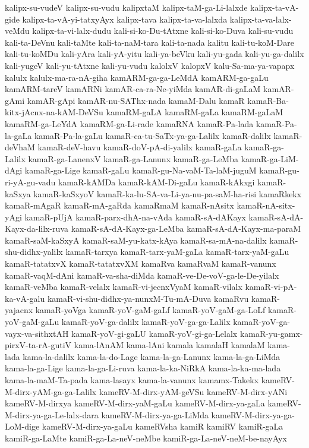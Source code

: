 {kalipx-su-vudeV
kalipx-su-vudu
kalipxtaM
kalipx-taM-ga-Li-lalxde
kalipx-ta-vA-gide
kalipx-ta-vA-yi-tatxyAyx
kalipx-tava
kalipx-ta-va-lalxda
kalipx-ta-va-lalx-veMdu
kalipx-ta-vi-lalx-dudu
kali-si-ko-Du-tAtxne
kali-si-ko-Duva
kali-su-vudu
kali-ta-DeVnu
kali-taMte
kali-ta-naM-tara
kali-ta-nada
kalitu
kali-tu-koM-Dare
kali-tu-koMDu
kali-yAra
kali-yA-yitu
kali-ya-beVku
kali-yu-gada
kali-yu-ga-dalilx
kali-yugeV
kali-yu-tAtxne
kali-yu-vudu
kalolxV
kalopxV
kalu-Sa-ma-ya-vapapx
kalulx
kalulx-ma-ra-nA-giha
kamARM-ga-ga-LeMdA
kamARM-ga-gaLu
kamARM-tareV
kamARNi
kamAR-ca-ra-Ne-yiMda
kamAR-di-gaLaM
kamAR-gAmi
kamAR-gApi
kamAR-nu-SAThx-nada
kamaM-Dalu
kamaR
kamaR-Ba-kitx-jAcnx-na-kAM-DeVSu
kamaRM-gaLA
kamaRM-gaLa
kamaRM-gaLaM
kamaRM-ga-LeYdA
kamaRM-ga-Li-rade
kamaRNA
kamaR-Pa-lada
kamaR-Pa-la-gaLa
kamaR-Pa-la-gaLu
kamaR-ca-tu-SaTx-ya-ga-Lalilx
kamaR-dalilx
kamaR-deVhaM
kamaR-deV-havu
kamaR-doV-pA-di-yalilx
kamaR-gaLa
kamaR-ga-Lalilx
kamaR-ga-LanenxV
kamaR-ga-Lanunx
kamaR-ga-LeMba
kamaR-ga-LiM-dAgi
kamaR-ga-Lige
kamaR-gaLu
kamaR-gu-Na-vaM-Ta-laM-juguM
kamaR-gu-ri-yA-gu-vadu
kamaR-kAMDa
kamaR-kAM-Di-gaLu
kamaR-kAkxgi
kamaR-kaSxya
kamaR-kaSxyoV
kamaR-ka-lu-SA-va-Li-ya-nu-pa-saM-ha-risi
kamaRkekx
kamaR-mAgaR
kamaR-mA-gaRda
kamaRmaM
kamaR-nAsitx
kamaR-nA-sitx-yAgi
kamaR-pUjA
kamaR-parx-dhA-na-vAda
kamaR-sA-dAKayx
kamaR-sA-dA-Kayx-da-lilx-ruva
kamaR-sA-dA-Kayx-ga-LeMba
kamaR-sA-dA-Kayx-ma-paraM
kamaR-saM-kaSxyA
kamaR-saM-yu-katx-kAya
kamaR-sa-mA-na-dalilx
kamaR-shu-didhx-yalilx
kamaR-tarxya
kamaR-tarx-yaM-gaLa
kamaR-tarx-yaM-gaLu
kamaR-tatatxvX
kamaR-tatatxvXM
kamaRva
kamaRvaM
kamaR-vanunx
kamaR-vaqM-dAni
kamaR-va-sha-diMda
kamaR-ve-De-voV-ga-le-De-yilalx
kamaR-veMba
kamaR-velalx
kamaR-vi-jecnxVyaM
kamaR-vilalx
kamaR-vi-pA-ka-vA-galu
kamaR-vi-shu-didhx-ya-nunxM-Tu-mA-Duva
kamaRvu
kamaR-yajacnx
kamaR-yoVga
kamaR-yoV-gaM-gaLf
kamaR-yoV-gaM-ga-LoLf
kamaR-yoV-gaM-gaLu
kamaR-yoV-ga-dalilx
kamaR-yoV-ga-ga-Lalilx
kamaR-yoV-ga-vayx-va-sithxtAH
kamaR-yoV-gi-gaLU
kamaR-yoV-gi-ga-Lelalx
kamaR-yu-gamx-pirxV-ta-rA-gutiV
kama-lAnAM
kama-lAni
kamala
kamalaH
kamalaM
kama-lada
kama-la-dalilx
kama-la-do-Lage
kama-la-ga-Lanunx
kama-la-ga-LiMda
kama-la-ga-Lige
kama-la-ga-Li-ruva
kama-la-ka-NiRkA
kama-la-ka-ma-lada
kama-la-maM-Ta-pada
kama-lasayx
kama-la-vanunx
kamamx-Takekx
kameRV-M-dirx-yAM-ga-ga-Lalilx
kameRV-M-dirx-yAM-geVSu
kameRV-M-dirx-yANi
kameRV-M-dirxya
kameRV-M-dirx-yaM-gaLu
kameRV-M-dirx-ya-gaLa
kameRV-M-dirx-ya-ga-Le-lalx-dara
kameRV-M-dirx-ya-ga-LiMda
kameRV-M-dirx-ya-ga-LoM-dige
kameRV-M-dirx-ya-gaLu
kameRVsha
kamiR
kamiRV
kamiR-gaLa
kamiR-ga-LaMte
kamiR-ga-La-neV-neMbe
kamiR-ga-La-neV-neM-be-nayAyx
}
